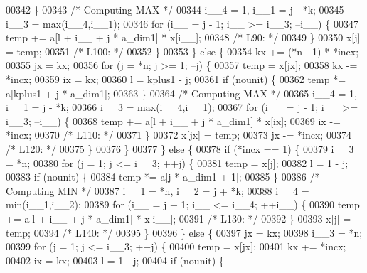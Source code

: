 \begin{DoxyCode}
00342             \}
00343 \textcolor{comment}{/* Computing MAX */}
00344             i\_\_4 = 1, i\_\_1 = j - *k;
00345             i\_\_3 = max(i\_\_4,i\_\_1);
00346             \textcolor{keywordflow}{for} (i\_\_ = j - 1; i\_\_ >= i\_\_3; --i\_\_) \{
00347             temp += a[l + i\_\_ + j * a\_dim1] * x[i\_\_];
00348 \textcolor{comment}{/* L90: */}
00349             \}
00350             x[j] = temp;
00351 \textcolor{comment}{/* L100: */}
00352         \}
00353         \} \textcolor{keywordflow}{else} \{
00354         kx += (*n - 1) * *incx;
00355         jx = kx;
00356         \textcolor{keywordflow}{for} (j = *n; j >= 1; --j) \{
00357             temp = x[jx];
00358             kx -= *incx;
00359             ix = kx;
00360             l = kplus1 - j;
00361             \textcolor{keywordflow}{if} (nounit) \{
00362             temp *= a[kplus1 + j * a\_dim1];
00363             \}
00364 \textcolor{comment}{/* Computing MAX */}
00365             i\_\_4 = 1, i\_\_1 = j - *k;
00366             i\_\_3 = max(i\_\_4,i\_\_1);
00367             \textcolor{keywordflow}{for} (i\_\_ = j - 1; i\_\_ >= i\_\_3; --i\_\_) \{
00368             temp += a[l + i\_\_ + j * a\_dim1] * x[ix];
00369             ix -= *incx;
00370 \textcolor{comment}{/* L110: */}
00371             \}
00372             x[jx] = temp;
00373             jx -= *incx;
00374 \textcolor{comment}{/* L120: */}
00375         \}
00376         \}
00377     \} \textcolor{keywordflow}{else} \{
00378         \textcolor{keywordflow}{if} (*incx == 1) \{
00379         i\_\_3 = *n;
00380         \textcolor{keywordflow}{for} (j = 1; j <= i\_\_3; ++j) \{
00381             temp = x[j];
00382             l = 1 - j;
00383             \textcolor{keywordflow}{if} (nounit) \{
00384             temp *= a[j * a\_dim1 + 1];
00385             \}
00386 \textcolor{comment}{/* Computing MIN */}
00387             i\_\_1 = *n, i\_\_2 = j + *k;
00388             i\_\_4 = min(i\_\_1,i\_\_2);
00389             \textcolor{keywordflow}{for} (i\_\_ = j + 1; i\_\_ <= i\_\_4; ++i\_\_) \{
00390             temp += a[l + i\_\_ + j * a\_dim1] * x[i\_\_];
00391 \textcolor{comment}{/* L130: */}
00392             \}
00393             x[j] = temp;
00394 \textcolor{comment}{/* L140: */}
00395         \}
00396         \} \textcolor{keywordflow}{else} \{
00397         jx = kx;
00398         i\_\_3 = *n;
00399         \textcolor{keywordflow}{for} (j = 1; j <= i\_\_3; ++j) \{
00400             temp = x[jx];
00401             kx += *incx;
00402             ix = kx;
00403             l = 1 - j;
00404             \textcolor{keywordflow}{if} (nounit) \{

\end{DoxyCode}
